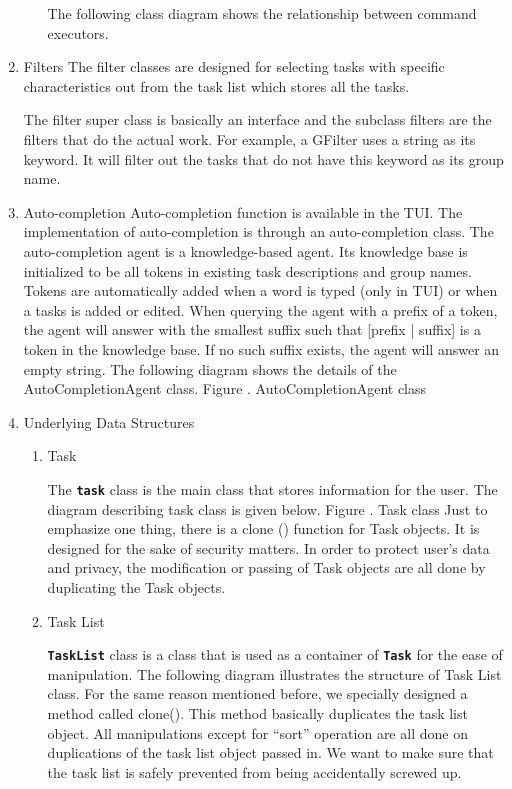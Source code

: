 \documentclass[12pt, a4paper]{article}
\newcommand{\cmdinline}[1]{{\bf \texttt{#1}}}
\begin{document}
\begin{enumerate}
\begin{enumerate}
The following class diagram shows the relationship between command executors.
\end{enumerate}

\item Filters
The filter classes are designed for selecting tasks with specific characteristics out from the
task list which stores all the tasks.

The filter super class is basically an interface and the subclass filters are the filters that do the
actual work. For example, a GFilter uses a string as its keyword. It will filter out the tasks that
do not have this keyword as its group name.

\item Auto-completion
Auto-completion function is available in the TUI. The implementation of auto-completion is
through an auto-completion class. The auto-completion agent is a knowledge-based agent.
Its knowledge base is initialized to be all tokens in existing task descriptions and group names.
Tokens are automatically added when a word is typed (only in TUI) or when a tasks is added
or edited. When querying the agent with a prefix of a token, the agent will answer with the
smallest suffix such that [prefix | suffix] is a token in the knowledge base. If no such suffix
exists, the agent will answer an empty string.
The following diagram shows the details of the AutoCompletionAgent class.
Figure . AutoCompletionAgent class

\item Underlying Data Structures
\begin{enumerate}
\item Task


The \cmdinline{task} class is the main class that stores information for the user. The diagram describing
task class is given below.
Figure . Task class
Just to emphasize one thing, there is a clone () function for Task objects. It is designed for the
sake of security matters. In order to protect user’s data and privacy, the modification or
passing of Task objects are all done by duplicating the Task objects.
\item Task List

\cmdinline{TaskList} class is a class that is used as a container of \cmdinline{Task} for the ease of manipulation.
The following diagram illustrates the structure of Task List class.
For the same reason mentioned before, we specially designed a method called clone(). This
method basically duplicates the task list object. All manipulations except for “sort” operation
are all done on duplications of the task list object passed in. We want to make sure that the
task list is safely prevented from being accidentally screwed up.
\end{enumerate}
\end{enumerate}
\end{document}
